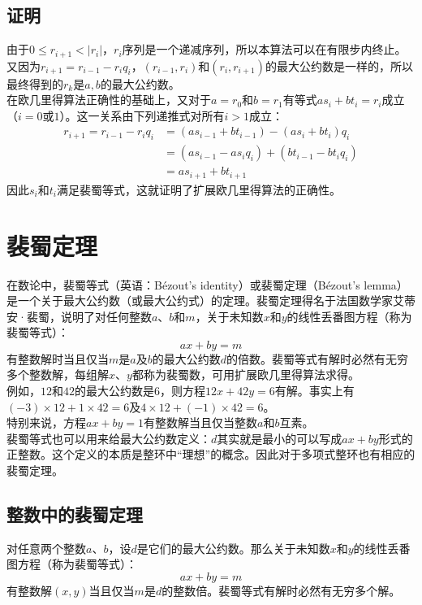 \documentclass[UTF8]{ctexart}
\begin{document}
\subsection*{证明}
由于$0 \leq r_{i+1} < |r_i|$，$r_i$序列是一个递减序列，所以本算法可以在有限步内终止。又因为$r_{i+1} = r_{i-1} - r_iq_i$，$(r_{i-1},r_i)$和$(r_i,r_{i+1})$的最大公约数是一样的，所以最终得到的$r_k$是$a,b$的最大公约数。\\
在欧几里得算法正确性的基础上，又对于$a = r_0$和$b = r_1$有等式$as_i + bt_i = r_i$成立（$i = 0$或$1$）。这一关系由下列递推式对所有$i > 1$成立：
\[
    \begin{aligned}
        r_{i+1} = r_{i-1} - r_iq_i & = (as_{i-1} + bt_{i-1}) -(as_i + bt_i)q_i \\
        & = (as_{i-1} - as_iq_i) + (bt_{i-1} - bt_iq_i) \\
        & = as_{i+1} + bt_{i+1}
    \end{aligned}
\]
因此$s_i$和$t_i$满足裴蜀等式，这就证明了扩展欧几里得算法的正确性。
\vfill
\section*{裴蜀定理}
在数论中，裴蜀等式（英语：Bézout's identity）或裴蜀定理\cite{裴蜀定理}（Bézout's lemma）是一个关于最大公约数（或最大公约式）的定理。裴蜀定理得名于法国数学家艾蒂安·裴蜀，说明了对任何整数$a$、$b$和$m$，关于未知数$x$和$y$的线性丢番图方程（称为裴蜀等式）：
\[ ax + by = m \]
有整数解时当且仅当$m$是$a$及$b$的最大公约数$d$的倍数。裴蜀等式有解时必然有无穷多个整数解，每组解$x$、$y$都称为裴蜀数，可用扩展欧几里得算法求得。\\
例如，$12$和$42$的最大公约数是$6$，则方程$12x + 42y = 6$有解。事实上有$(-3) \times 12 + 1 \times 42 = 6$及$4 \times 12 + (-1) \times 42 = 6$。\\
特别来说，方程$ax + by = 1$有整数解当且仅当整数$a$和$b$互素。\\
裴蜀等式也可以用来给最大公约数定义：$d$其实就是最小的可以写成$ax + by$形式的正整数。这个定义的本质是整环中“理想”的概念。因此对于多项式整环也有相应的裴蜀定理。
\subsection*{整数中的裴蜀定理}
对任意两个整数$a$、$b$，设$d$是它们的最大公约数。那么关于未知数$x$和$y$的线性丢番图方程（称为裴蜀等式）：
\[ ax + by = m \]
有整数解$(x,y)$当且仅当$m$是$d$的整数倍。裴蜀等式有解时必然有无穷多个解。
\end{document}
